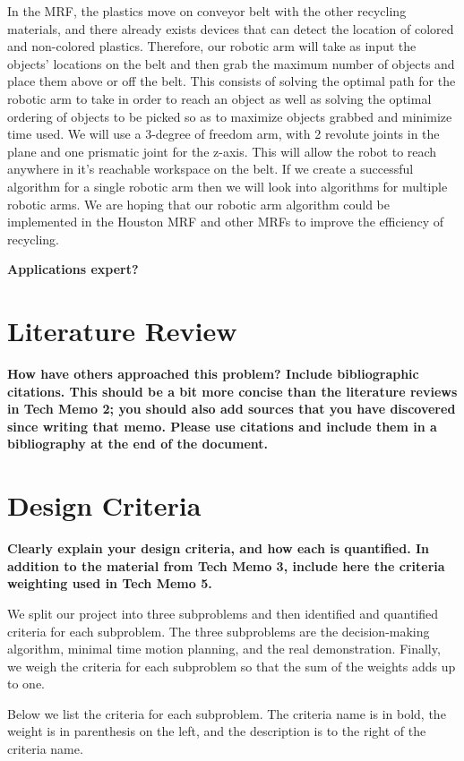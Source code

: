 \documentclass [11pt ]{ report}
\renewcommand{\b}{\textbf}
\begin{document}
In the MRF, the plastics move on conveyor belt with the other recycling materials, and there already exists devices that can detect the location of colored and non-colored plastics. Therefore, our robotic arm will take as input the objects' locations on the belt and then grab the maximum number of objects and place them above or off the belt. This consists of solving the optimal path for the robotic arm to take in order to reach an object as well as solving the optimal ordering of objects to be picked so as to maximize objects grabbed and minimize time used. We will use a 3-degree of freedom arm, with 2 revolute joints in the plane and one prismatic joint for the z-axis. This will allow the robot to reach anywhere in it's reachable workspace on the belt. If we create a successful algorithm for a single robotic arm then we will look into algorithms for multiple robotic arms. We are hoping that our robotic arm algorithm could be implemented in the Houston MRF and other MRFs to improve the efficiency of recycling.


\b{Applications expert?}


\section{Literature Review}
\b{How have others approached this problem? Include bibliographic citations.
This should be a bit more concise than the literature reviews in Tech Memo 2; you
should also add sources that you have discovered since writing that memo. Please use citations
and include them in a bibliography at the end of the document.}

\section{Design Criteria}
\b{Clearly explain your design criteria, and how each is quantified. In addition
to the material from Tech Memo 3, include here the criteria weighting used in Tech Memo 5.}

We split our project into three subproblems and then identified and quantified criteria for each subproblem. The three subproblems are the decision-making algorithm, minimal time motion planning, and the real demonstration. Finally, we weigh the criteria for each subproblem so that the sum of the weights adds up to one. 

Below we list the criteria for each subproblem. The criteria name is in bold, the weight is in parenthesis on the left, and the description is to the right of the criteria name.
\end{document}
